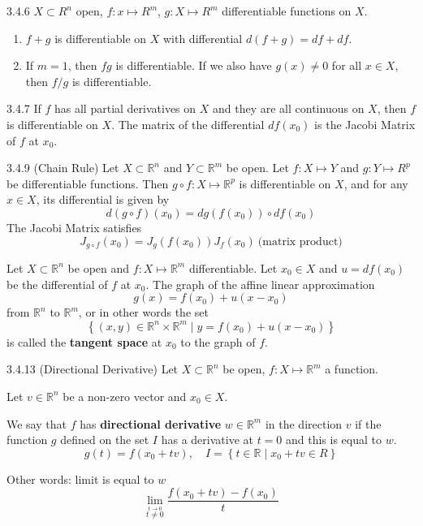 \documentclass[8pt,a4paper,twocolumn,table]{extarticle}
\newcommand{\R}{\mathbb{R}}
\begin{document}
\begin{proposition}{3.4.6}
    $X \subset R^n$ open, $f: x \mapsto R^m$, $g: X \mapsto R^m$ differentiable functions on $X$.
    \begin{enumerate}
        \item $f + g$ is differentiable on $X$ with differential $d(f + g) = df + df$.
        \item If $m = 1$, then $fg$ is differentiable. If we also have $g(x) \ne 0$ for all
              $x \in X$, then $f/g$ is differentiable.
    \end{enumerate}
\end{proposition}

\begin{proposition}{3.4.7}
    If $f$ has all partial derivatives on $X$ and they are all continuous on $X$, then $f$ is differentiable on $X$.
    The matrix of the differential $df(x_0)$ is the Jacobi Matrix of $f$ at $x_0$.
\end{proposition}

\begin{proposition}{3.4.9 (Chain Rule)}
    Let $X \subset \R^n$ and $Y \subset \R^m$ be open.
    Let $f: X \mapsto Y$ and $g: Y \mapsto R^p$ be differentiable functions.
    Then $g \circ f: X \mapsto \R^p$ is differentiable on $X$, and for any $x \in X$, its differential is given by
    \[ d(g \circ f)(x_0) = dg(f(x_0)) \circ df(x_0) \]
    The Jacobi Matrix satisfies
    \[ J_{g \circ f}(x_0) = J_g(f(x_0)) J_f(x_0)\ \mbox{(matrix product)}\]
\end{proposition}


\begin{definition}
    Let $X \subset \R^n$ be open and $f: X \mapsto \R^m$ differentiable.
    Let $x_0 \in X$ and $u = df(x_0)$ be the differential of $f$ at $x_0$. The graph of the affine linear approximation
    \[ g(x) = f(x_0) + u(x - x_0) \]
    from $\R^n$ to $\R^m$, or in other words the set
    \[ \left\{ (x,y) \in \R^n \times \R^m \mid y = f(x_0) + u(x - x_0) \right\} \]
    is called the \textbf{tangent space} at $x_0$ to the graph of $f$.
\end{definition}

\begin{definition}{3.4.13 (Directional Derivative)}
    Let $X \subset \R^n$ be open, $f: X \mapsto \R^m$ a function.

    Let $v \in \R^n$ be a non-zero vector and $x_0 \in X$.

    We say that $f$ has \textbf{directional derivative} $w \in \R^m$ in the direction $v$
    if the function $g$ defined on the set $I$ has a derivative at $t = 0$ and this is equal to $w$.
    \[ g(t) = f(x_0 + tv), \quad I = \left\{ t \in \R \mid x_0 + tv \in R \right\} \]

    Other words: limit is equal to $w$
    \[ \lim_{\stackrel{t \to 0}{t \ne 0}} \frac{f(x_0 + tv) - f(x_0)}{t} \]
\end{definition}
\end{document}
